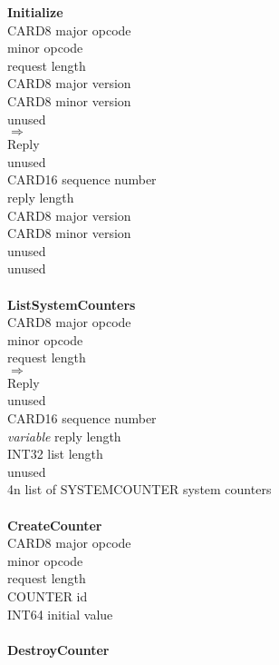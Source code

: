 \begin{tabbing}
\tabstopsC
{\bf Initialize}\\
		\> CARD8	\> major opcode \\
				\> minor opcode \\
	\> 2			\> request length \\
		\> CARD8	\> major version \\
		\> CARD8	\> minor version \\
		\> 		\> unused \\
$\Rightarrow$\\
	\> 1			\> Reply \\
		\>		\> unused \\
		\> CARD16	\> sequence number \\
				\> reply length \\
		\> CARD8	\> major version \\
		\> CARD8	\> minor version \\
		\>		\> unused \\
		\>		\> unused \\
\\
{\bf ListSystemCounters}\\
		\> CARD8	\> major opcode \\
	\> 1			\> minor opcode \\
				\> request length \\
$\Rightarrow$\\
	\> 1			\> Reply \\
		\>		\> unused \\
		\> CARD16	\> sequence number \\
		\> {\it variable} \> reply length \\
		\> INT32	\> list length \\
		\>		\> unused \\
	\> 4n   \> list of SYSTEMCOUNTER \> system counters \\
\\
{\bf CreateCounter}\\
		\> CARD8	\> major opcode \\
				\> minor opcode \\
				\> request length \\
		\> COUNTER	\> id\\
		\> INT64	\> initial value\\
\\
{\bf DestroyCounter}\\

\end{tabbing}
